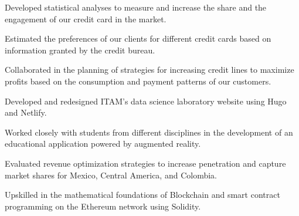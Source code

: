 \documentclass[]{resume}
\begin{document}
\begin{minipage}[t]{0.70\textwidth}
\begin{tightemize}
\sectionsep
\item Developed statistical analyses to measure and increase the share and the engagement of our credit card in the market.
\item Estimated the preferences of our clients for different credit cards based on information granted by the credit bureau.
\item Collaborated in the planning of strategies for increasing credit lines to maximize profits based on the consumption and payment patterns of our customers.
\end{tightemize}
\sectionsep

\begin{tightemize}
\sectionsep
\item Developed and redesigned ITAM's data science laboratory website using Hugo and Netlify.
\item Worked closely with students from different disciplines in the development of an educational application powered by augmented reality.
\end{tightemize}
\sectionsep

\begin{tightemize}
\sectionsep
\item Evaluated revenue optimization strategies to increase penetration and capture market shares for Mexico, Central America, and Colombia.
\end{tightemize}
\sectionsep

\begin{tightemize}
\sectionsep
\item Upskilled in the mathematical foundations of Blockchain and smart contract programming on the Ethereum network using Solidity.
\end{tightemize}
\sectionsep


\end{minipage}
\hfill
\end{document}
